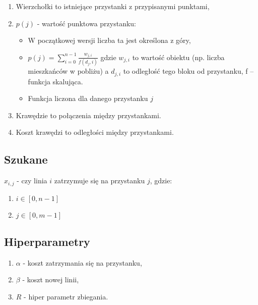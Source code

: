 \documentclass[12pt,a4paper,openright]{mwrep}
\begin{document}
	\begin{enumerate}
		\item Wierzchołki to istniejące przystanki z przypisanymi punktami,
		\item $p(j)$ - wartość punktowa przystanku:
		\begin{itemize}
            \item  W początkowej wersji liczba ta jest określona z góry,
			\item $p(j) = \sum_{i=0}^{n-1} \frac{w_{j, i}}{f(d_j, i)}$ gdzie $w_{j, i}$ to wartość obiektu (np. liczba mieszkańców w pobliżu) a $d_{j,i}$ to odległość tego bloku od przystanku, f – funkcja skalująca.
			\item Funkcja liczona dla danego przystanku $j$
		\end{itemize}
		\item Krawędzie to połączenia między przystankami.
		\item Koszt krawędzi to odległości między przystankami.
	\end{enumerate}










\subsection{Szukane}
	$x_{i,j}$ - czy linia $i$ zatrzymuje się na przystanku $j$, gdzie:
	\begin{enumerate}
		\item $i \in \left[ 0, n-1 \right]$
		\item $j \in \left[ 0, m-1 \right]$
	\end{enumerate}

\subsection{Hiperparametry}
	\begin{enumerate}
		\item $\alpha$ - koszt zatrzymania się na przystanku,
		\item $\beta$ - koszt nowej linii,
		\item $R$ - hiper parametr zbiegania.
	\end{enumerate}
\end{document}
